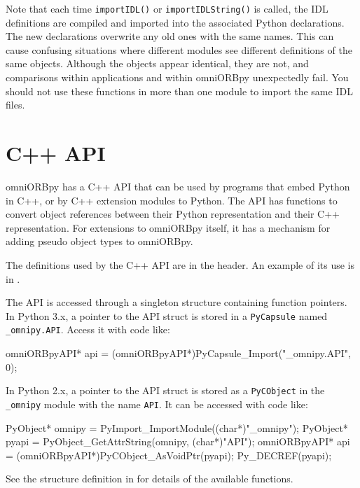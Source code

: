 \documentclass[11pt,oneside,a4paper]{book}
\newcommand{\module}[1]{\texttt{#1}}
\newcommand{\code}[1]{\texttt{#1}}
\newcommand{\op}[1]{\texttt{#1()}}
\begin{document}
Note that each time \op{importIDL} or \op{importIDLString} is called,
the IDL definitions are compiled and imported into the associated
Python declarations. The new declarations overwrite any old ones with
the same names. This can cause confusing situations where different
modules see different definitions of the same objects. Although the
objects appear identical, they are not, and comparisons within
applications and within omniORBpy unexpectedly fail. You should not
use these functions in more than one module to import the same IDL
files.


\section{C++ API}

omniORBpy has a C++ API that can be used by programs that embed Python
in C++, or by C++ extension modules to Python. The API has functions
to convert object references between their Python representation and
their C++ representation. For extensions to omniORBpy itself, it has a
mechanism for adding pseudo object types to omniORBpy.

The definitions used by the C++ API are in the 
header. An example of its use is in .

The API is accessed through a singleton structure containing function
pointers. In Python 3.x, a pointer to the API struct is stored in a
\code{PyCapsule} named \code{\_omnipy.API}. Access it with code like:

\begin{cxxlisting}
omniORBpyAPI* api = (omniORBpyAPI*)PyCapsule_Import("_omnipy.API", 0);
\end{cxxlisting}

\noindent In Python 2.x, a pointer to the API struct is stored as a
\code{PyCObject} in the \module{\_omnipy} module with the name
\code{API}. It can be accessed with code like:

\begin{cxxlisting}
PyObject*     omnipy = PyImport_ImportModule((char*)"_omnipy");
PyObject*     pyapi  = PyObject_GetAttrString(omnipy, (char*)"API");
omniORBpyAPI* api    = (omniORBpyAPI*)PyCObject_AsVoidPtr(pyapi);
Py_DECREF(pyapi);
\end{cxxlisting}

\noindent See the structure definition in  for
details of the available functions.
\end{document}
